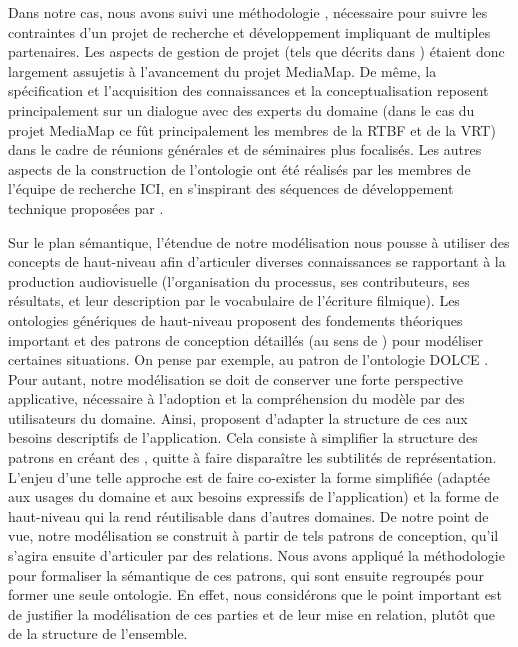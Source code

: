 Dans notre cas, nous avons suivi une méthodologie , nécessaire pour suivre les contraintes d'un projet de recherche et développement impliquant de multiples partenaires.
Les aspects de gestion de projet (tels que décrits dans ) étaient donc largement assujetis à l'avancement du projet MediaMap.
De même, la spécification et l'acquisition des connaissances et la conceptualisation reposent principalement sur un dialogue avec des experts du domaine (dans le cas du projet MediaMap ce fût principalement les membres de la RTBF et de la VRT) dans le cadre de réunions générales et de séminaires plus focalisés.
Les autres aspects de la construction de l'ontologie ont été réalisés par les membres de l'équipe de recherche ICI, en s'inspirant des séquences de développement technique proposées par .

Sur le plan sémantique, l'étendue de notre modélisation nous pousse à utiliser des concepts de haut-niveau afin d'articuler diverses connaissances se rapportant à la production audiovisuelle (l'organisation du processus, ses contributeurs, ses résultats, et leur description par le vocabulaire de l'écriture filmique).
Les ontologies génériques de haut-niveau proposent des fondements théoriques important et des patrons de conception détaillés (au sens de \cite{Isaac2005}) pour modéliser certaines situations. 
On pense par exemple, au patron  de l'ontologie DOLCE . 
Pour autant, notre modélisation se doit de conserver une forte perspective applicative, nécessaire à l'adoption et la compréhension du modèle par des utilisateurs du domaine.
Ainsi, \citeauthor{Isaac2005} proposent d'adapter la structure de ces  aux besoins descriptifs de l'application.
Cela consiste à simplifier la structure des patrons en créant des , quitte à faire disparaître les subtilités de représentation.
L'enjeu d'une telle approche est de faire co-exister la forme simplifiée (adaptée aux usages du domaine et aux besoins expressifs de l'application) et la forme de haut-niveau qui la rend réutilisable dans d'autres domaines.
De notre point de vue, notre modélisation se construit à partir de tels patrons de conception, qu'il s'agira ensuite d'articuler par des relations. 
Nous avons appliqué la méthodologie  pour formaliser la sémantique de ces patrons, qui sont ensuite regroupés pour former une seule ontologie.
En effet, nous considérons que le point important est de justifier la modélisation de ces parties et de leur mise en relation, plutôt que de la structure de l'ensemble.














